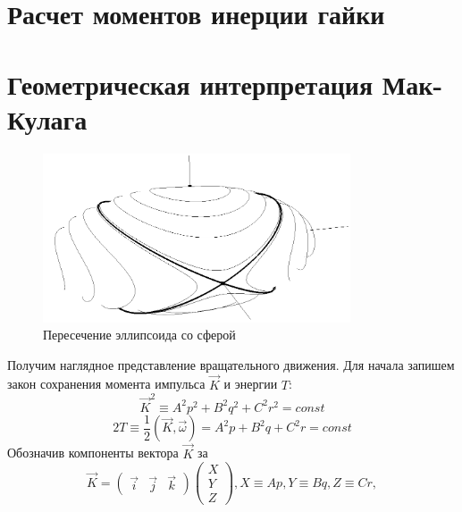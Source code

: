 \documentclass{article}
\begin{document}
\section{Расчет моментов инерции гайки}
\section{Геометрическая интерпретация Мак-Кулага}
\begin{figure}[h]
\includegraphics[height=5cm]{ellipsoid}
\caption{Пересечение эллипсоида со сферой}
\end{figure}
Получим наглядное представление вращательного движения. Для начала запишем закон сохранения момента импульса \begin{math} \vec{K} \end{math} и энергии \begin{math} T \end{math}:
\begin{equation}
\label{angularMomentumInv}
\vec{K}^2\equiv A^2p^2+B^2q^2+C^2r^2=const
\end{equation}
\begin{equation}
\label{energyInv}
2T\equiv\frac{1}{2}\left(\vec{K},\vec{\omega}\right)=A^2p+B^2q+C^2r=const
\end{equation}
Обозначив компоненты вектора \begin{math} \vec{K} \end{math} за
\begin{equation}
\vec{K}=
\left(
\begin{array}{lcr}
\vec{i} & \vec{j} & \vec{k}
\end{array}
\right)
\left(
\begin{array}{lcr}
X\\
Y\\
Z
\end{array}
\right),
X\equiv Ap,Y\equiv Bq,Z\equiv Cr,
\end{equation}
\end{document}
